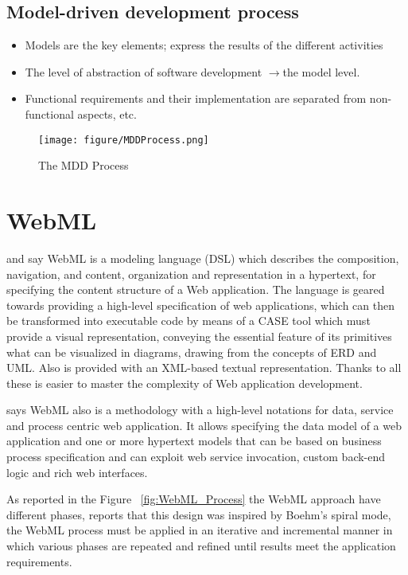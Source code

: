 \documentclass[a4paper]{memoir}
\begin{document}
		\subsection{Model-driven development process}
		\begin{itemize}
			\item Models are the key elements; express the results of the different activities
			\item The level of abstraction of software development $\rightarrow$the model level.
			\item Functional requirements and their implementation are separated from non-functional aspects, etc.
		\end{itemize}
	
	\begin{figure}[here]
	\texttt{[image: figure/MDDProcess.png]}
	\caption{The MDD Process}
	\label{fig:MDD_Process}
	\end{figure}
	
	
	\section{\ac{WebML}} %
	\label{sect:WebML}
	\cite{Nugraha2007} and \cite{Matera2003} say \ac{WebML} is a modeling language (\ac{DSL}) which describes the composition, navigation, and content, organization and representation in a hypertext, for specifying the content structure of a Web application. The language is geared towards providing a high-level specification of web applications, which can then be transformed into executable code by means of a \ac{CASE} tool which must provide a visual representation, conveying the essential feature of its primitives what can be visualized in diagrams, drawing from the concepts of \ac{ERD} and \ac{UML}. Also is provided with an \ac{XML}-based textual representation. Thanks to all these is easier to master the complexity of Web application development. 
	
	\cite{Brambilla} says \ac{WebML} also is a methodology with a high-level notations for data, service and process centric web application. It allows specifying the data model of a web application and one or more hypertext models that can be based on business process specification and can exploit web service invocation, custom back-end logic and rich web interfaces.
	
	As reported in the Figure ~\ref{fig:WebML_Process} the \ac{WebML} approach have different phases, \cite{Ceri2003} reports that this design was inspired by Boehm's spiral mode, the \ac{WebML} process must be applied in an iterative and incremental manner in which various phases are repeated and refined until results meet the application requirements.
	
\end{document}
